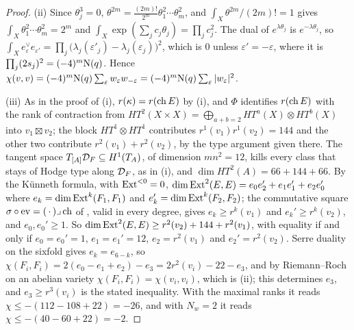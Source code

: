 \begin{proof}
(ii) Since $\theta_{j}^{3}=0$, $\theta^{2m}=\frac{(2m)!}{2^{m}}\theta_{1}^{2}
\cdots\theta_{m}^{2}$, and $\int_{X}\theta^{2m}/(2m)!=1$ gives
$\int_{X}\theta_{1}^{2}\cdots\theta_{m}^{2}=2^{m}$ and
$\int_{X}\exp(\sum_{j}c_{j}\theta_{j})=\prod_{j}c_{j}^{2}$. The dual of
$e^{\lambda\theta_{j}}$ is $e^{-\lambda\theta_{j}}$, so
$\int_{X}e_{\varepsilon}^{\vee}e_{\varepsilon'}=\prod_{j}\bigl(\lambda_{j}(\varepsilon'_{j})
-\lambda_{j}(\varepsilon_{j})\bigr)^{2}$, which is $0$ unless
$\varepsilon'=-\varepsilon$, where it is $\prod_{j}(2s_{j})^{2}=(-4)^{m}\mathrm{N}(q)$.
Hence $\chi(v,v)=(-4)^{m}\mathrm{N}(q)\sum_{\varepsilon}w_{\varepsilon}w_{-\varepsilon}
=(-4)^{m}\mathrm{N}(q)\sum_{\varepsilon}|w_{\varepsilon}|^{2}$.

(iii) As in the proof of (i), $r(\kappa)=r(\operatorname{ch} E)$
by (i), and $\Phi$ identifies $r(\operatorname{ch} E)$ with the rank of
contraction from $HT^{2}(X\times X)=\bigoplus_{a+b=2}HT^{a}(X)\otimes HT^{b}(X)$
into $v_{1}\boxtimes v_{2}$; the block $HT^{1}\otimes HT^{1}$ contributes
$r^{1}(v_{1})r^{1}(v_{2})=144$ and the other two contribute
$r^{2}(v_{1})+r^{2}(v_{2})$, by the type argument given there. The tangent
space $T_{[A]}\mathcal{D}_{F}\subseteq H^{1}(T_{A})$, of dimension $mn^{2}=12$, kills
every class that stays of Hodge type along $\mathcal{D}_{F}$, as in
(i), and $\dim HT^{2}(A)=66+144+66$. By the K\"unneth
formula, with $\operatorname{Ext}^{<0}=0$,
$\dim\operatorname{Ext}^{2}(E,E)=e_{0}e_{2}'+e_{1}e_{1}'+e_{2}e_{0}'$ where
$e_{k}=\dim\operatorname{Ext}^{k}(F_{1},F_{1})$ and $e_{k}'=\dim\operatorname{Ext}^{k}(F_{2},F_{2})$; the
commutative square $\sigma\circ\operatorname{ev}=(\,\cdot\,)\lrcorner\operatorname{ch}$ of
, valid in every degree, gives $e_{k}\ge r^{k}(v_{1})$
and $e_{k}'\ge r^{k}(v_{2})$, and $e_{0},e_{0}'\ge1$. So
$\dim\operatorname{Ext}^{2}(E,E)\ge r^{2}(v_{2})+144+r^{2}(v_{1})$, with equality if and
only if $e_{0}=e_{0}'=1$, $e_{1}=e_{1}'=12$, $e_{2}=r^{2}(v_{1})$ and
$e_{2}'=r^{2}(v_{2})$. Serre duality on the sixfold gives $e_{k}=e_{6-k}$, so
$\chi(F_{i},F_{i})=2(e_{0}-e_{1}+e_{2})-e_{3}=2r^{2}(v_{i})-22-e_{3}$, and by
Riemann--Roch on an abelian variety $\chi(F_{i},F_{i})=\chi(v_{i},v_{i})$,
which is (ii); this determines $e_{3}$, and $e_{3}\ge r^{3}(v_{i})$ is the
stated inequality. With the maximal ranks it reads
$\chi\le-(112-108+22)=-26$, and with $N_{w}=2$ it reads
$\chi\le-(40-60+22)=-2$.


\end{proof}
